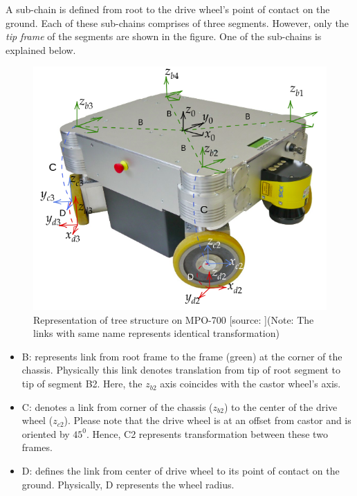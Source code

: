 A sub-chain is defined from root to the drive wheel's point of contact on the ground. Each of these sub-chains comprises of three segments. However, only the \textit{tip frame} of the segments are shown in the figure. One of the sub-chains is explained below.

\begin{figure}[h!]
	\begin{center}
		\includegraphics[scale=0.45]{images/MPO-700-tree}
	\end{center}	
	\caption{Representation of tree structure on MPO-700 [source: \cite{MPO700-Datasheet}](Note: The links with same name represents identical transformation)}
	\label{fig:tree-MPO}
\end{figure}

\begin{itemize}
	\item B: represents link from root frame to the frame (green) at the corner of the chassis. Physically this link denotes translation from tip of root segment to tip of segment B2. Here, the $z_{b2}$ axis coincides with the castor wheel's axis.
	\item C: denotes a link from corner of the chassis ($z_{b2}$) to the center of the drive wheel ($z_{c2}$). Please note that the drive wheel is at an offset from castor and is oriented by $45^0$. Hence, C2 represents transformation between these two frames.
	\item D: defines the link from center of drive wheel to its point of contact on the ground. Physically, D represents the wheel radius. 
\end{itemize}



